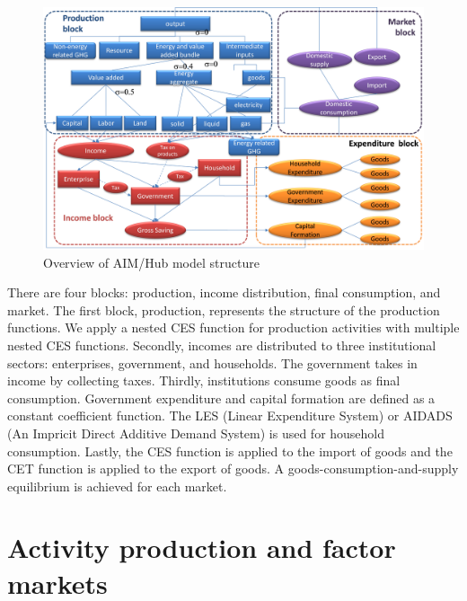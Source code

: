 \documentclass[10pt,a4paper,titlepage,dvipdfmx]{book}
\begin{document}
\begin{figure}
\includegraphics[width=1\textwidth]{fig/image2.png} 
\caption{\label{fig:overview} Overview of AIM/Hub model structure}
\end{figure}

There are four blocks: production, income distribution, final consumption, and market. The first block, production, represents the structure of the production functions. We apply a nested CES function for production activities with multiple nested CES functions. Secondly, incomes are distributed to three institutional sectors: enterprises, government, and households. The government takes in income by collecting taxes. Thirdly, institutions consume goods as final consumption. Government expenditure and capital formation are defined as a constant coefficient function. The LES (Linear Expenditure System) or AIDADS (An Impricit Direct Additive Demand System) is used for household consumption. Lastly, the CES function is applied to the import of goods and the CET function is applied to the export of goods. A goods-consumption-and-supply equilibrium is achieved for each market.

\section{\label{sec:ActProdFac}Activity production and factor markets}
\end{document}
